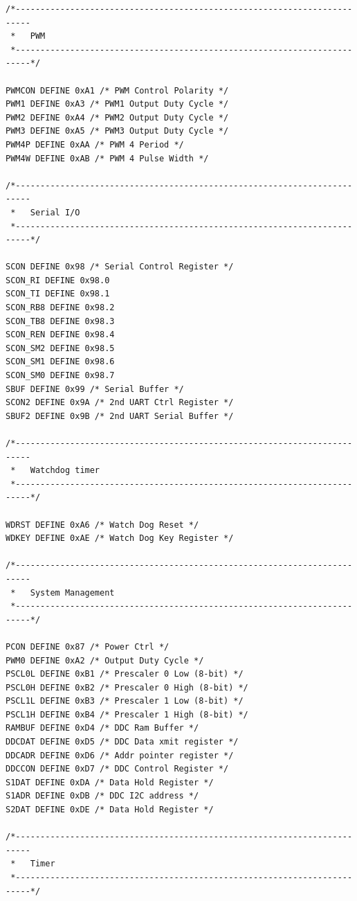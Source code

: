 \documentclass[10pt,a4paper,final]{article}
\begin{document}
\begin{lstlisting}[label={list:first},caption=Code source]
/*-------------------------------------------------------------------------
 *   PWM
 *-------------------------------------------------------------------------*/

PWMCON DEFINE 0xA1 /* PWM Control Polarity */
PWM1 DEFINE 0xA3 /* PWM1 Output Duty Cycle */
PWM2 DEFINE 0xA4 /* PWM2 Output Duty Cycle */
PWM3 DEFINE 0xA5 /* PWM3 Output Duty Cycle */
PWM4P DEFINE 0xAA /* PWM 4 Period */
PWM4W DEFINE 0xAB /* PWM 4 Pulse Width */

/*-------------------------------------------------------------------------
 *   Serial I/O
 *-------------------------------------------------------------------------*/

SCON DEFINE 0x98 /* Serial Control Register */
SCON_RI DEFINE 0x98.0
SCON_TI DEFINE 0x98.1
SCON_RB8 DEFINE 0x98.2
SCON_TB8 DEFINE 0x98.3
SCON_REN DEFINE 0x98.4
SCON_SM2 DEFINE 0x98.5
SCON_SM1 DEFINE 0x98.6
SCON_SM0 DEFINE 0x98.7
SBUF DEFINE 0x99 /* Serial Buffer */
SCON2 DEFINE 0x9A /* 2nd UART Ctrl Register */
SBUF2 DEFINE 0x9B /* 2nd UART Serial Buffer */

/*-------------------------------------------------------------------------
 *   Watchdog timer
 *-------------------------------------------------------------------------*/

WDRST DEFINE 0xA6 /* Watch Dog Reset */
WDKEY DEFINE 0xAE /* Watch Dog Key Register */

/*-------------------------------------------------------------------------
 *   System Management
 *-------------------------------------------------------------------------*/

PCON DEFINE 0x87 /* Power Ctrl */
PWM0 DEFINE 0xA2 /* Output Duty Cycle */
PSCL0L DEFINE 0xB1 /* Prescaler 0 Low (8-bit) */
PSCL0H DEFINE 0xB2 /* Prescaler 0 High (8-bit) */
PSCL1L DEFINE 0xB3 /* Prescaler 1 Low (8-bit) */
PSCL1H DEFINE 0xB4 /* Prescaler 1 High (8-bit) */
RAMBUF DEFINE 0xD4 /* DDC Ram Buffer */
DDCDAT DEFINE 0xD5 /* DDC Data xmit register */
DDCADR DEFINE 0xD6 /* Addr pointer register */
DDCCON DEFINE 0xD7 /* DDC Control Register */
S1DAT DEFINE 0xDA /* Data Hold Register */
S1ADR DEFINE 0xDB /* DDC I2C address */
S2DAT DEFINE 0xDE /* Data Hold Register */

/*-------------------------------------------------------------------------
 *   Timer
 *-------------------------------------------------------------------------*/


\end{lstlisting}
\end{document}

